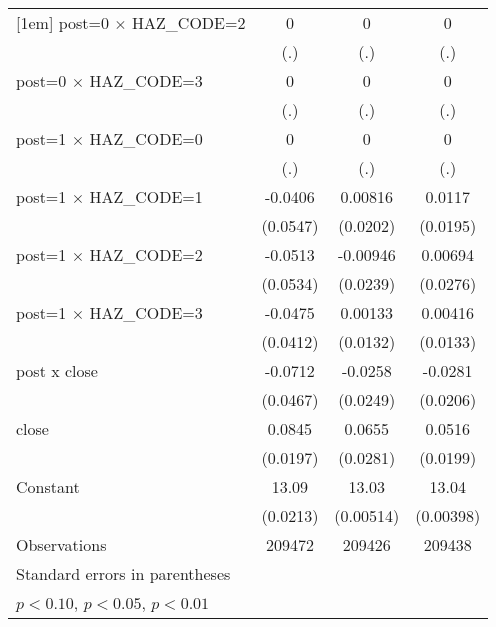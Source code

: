 \begin{table}[htbp]
\begin{tabular}{l*{3}{c}}
[1em]
post=0 $\times$ HAZ\_CODE=2&           0         &           0         &           0         \\
                    &         (.)         &         (.)         &         (.)         \\
[1em]
post=0 $\times$ HAZ\_CODE=3&           0         &           0         &           0         \\
                    &         (.)         &         (.)         &         (.)         \\
[1em]
post=1 $\times$ HAZ\_CODE=0&           0         &           0         &           0         \\
                    &         (.)         &         (.)         &         (.)         \\
[1em]
post=1 $\times$ HAZ\_CODE=1&     -0.0406         &     0.00816         &      0.0117         \\
                    &    (0.0547)         &    (0.0202)         &    (0.0195)         \\
[1em]
post=1 $\times$ HAZ\_CODE=2&     -0.0513         &    -0.00946         &     0.00694         \\
                    &    (0.0534)         &    (0.0239)         &    (0.0276)         \\
[1em]
post=1 $\times$ HAZ\_CODE=3&     -0.0475         &     0.00133         &     0.00416         \\
                    &    (0.0412)         &    (0.0132)         &    (0.0133)         \\
[1em]
post x close        &     -0.0712         &     -0.0258         &     -0.0281         \\
                    &    (0.0467)         &    (0.0249)         &    (0.0206)         \\
[1em]
close               &      0.0845\sym{***}&      0.0655\sym{**} &      0.0516\sym{***}\\
                    &    (0.0197)         &    (0.0281)         &    (0.0199)         \\
[1em]
Constant            &       13.09\sym{***}&       13.03\sym{***}&       13.04\sym{***}\\
                    &    (0.0213)         &   (0.00514)         &   (0.00398)         \\
\hline
Observations        &      209472         &      209426         &      209438         \\
\hline\hline
\multicolumn{4}{l}{\footnotesize Standard errors in parentheses}\\
\multicolumn{4}{l}{\footnotesize \sym{*} \(p<0.10\), \sym{**} \(p<0.05\), \sym{***} \(p<0.01\)}\\
\end{tabular}
\end{table}
